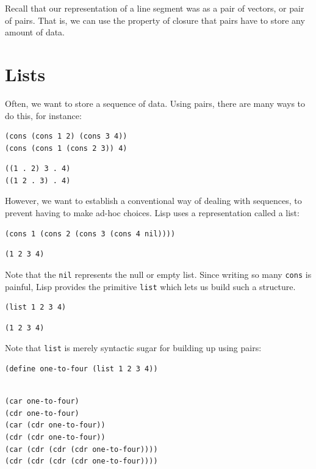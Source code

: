 \documentclass[9pt]{report}
\begin{document}
Recall that our representation of a line segment was as a pair of
vectors, or pair of pairs. That is, we can use the property of
closure that pairs have to store any amount of data.

\section{Lists}
\label{sec:org256a7e0}
Often, we want to store a sequence of data. Using pairs, there are
many ways to do this, for instance:

\begin{verbatim}
(cons (cons 1 2) (cons 3 4))
(cons (cons 1 (cons 2 3)) 4)
\end{verbatim}

\begin{verbatim}
((1 . 2) 3 . 4)
((1 2 . 3) . 4)
\end{verbatim}


However, we want to establish a conventional way of dealing with
sequences, to prevent having to make ad-hoc choices. Lisp uses a
representation called a list:

\begin{verbatim}
(cons 1 (cons 2 (cons 3 (cons 4 nil))))
\end{verbatim}

\begin{verbatim}
(1 2 3 4)
\end{verbatim}


Note that the \texttt{nil} represents the null or empty list. Since
writing so many \texttt{cons} is painful, Lisp provides the primitive
\texttt{list} which lets us build such a structure.

\begin{verbatim}
(list 1 2 3 4)
\end{verbatim}

\begin{verbatim}
(1 2 3 4)
\end{verbatim}


Note that \texttt{list} is merely syntactic sugar for building up using
pairs:

\begin{verbatim}
(define one-to-four (list 1 2 3 4))
\end{verbatim}

\begin{verbatim}

(car one-to-four)
(cdr one-to-four)
(car (cdr one-to-four))
(cdr (cdr one-to-four))
(car (cdr (cdr (cdr one-to-four))))
(cdr (cdr (cdr (cdr one-to-four))))
\end{verbatim}
\end{document}
